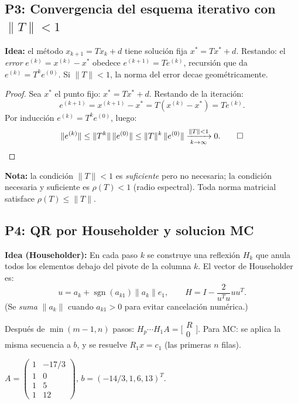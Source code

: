 \documentclass[11pt,a4paper]{article}
\begin{document}
\subsection{P3: Convergencia del esquema iterativo con $\|T\|<1$}
\label{sec:q2_2017_p3}

\textbf{Idea:} el método $x_{k+1}=Tx_k+d$ tiene solución fija $x^*=Tx^*+d$. Restando: el \emph{error} $e^{(k)}=x^{(k)}-x^*$ obedece $e^{(k+1)}=Te^{(k)}$, recursión que da $e^{(k)}=T^ke^{(0)}$. Si $\|T\|<1$, la norma del error decae geométricamente.

\begin{proof}
Sea $x^*$ el punto fijo: $x^* = Tx^* + d$. Restando de la iteración:
\[
  e^{(k+1)} = x^{(k+1)} - x^* = T(x^{(k)}-x^*) = Te^{(k)}.
\]
Por inducción $e^{(k)} = T^k e^{(0)}$, luego:
\[
  \|e^{(k)}\| \le \|T^k\|\,\|e^{(0)}\| \le \|T\|^k\,\|e^{(0)}\| \xrightarrow[k\to\infty]{\|T\|<1} 0. \qed
\]
\end{proof}

\textbf{Nota:} la condición $\|T\|<1$ es \emph{suficiente} pero no necesaria; la condición necesaria y suficiente es $\rho(T)<1$ (radio espectral). Toda norma matricial satisface $\rho(T)\le\|T\|$.

\subsection{P4: QR por Householder y solucion MC}
\label{sec:q2_2017_p4}

\textbf{Idea (Householder):} En cada paso $k$ se construye una reflexión $H_k$ que anula todos los elementos debajo del pivote de la columna $k$. El vector de Householder es:
\[
  u = a_k + \operatorname{sgn}(a_{k1})\|a_k\|e_1, \qquad H = I - \frac{2}{u^Tu}uu^T.
\]
(Se \emph{suma} $\|a_k\|$ cuando $a_{k1}>0$ para evitar cancelación numérica.)

Después de $\min(m-1,n)$ pasos: $H_p\cdots H_1 A = \bigl[\begin{smallmatrix}R\\0\end{smallmatrix}\bigr]$. Para MC: se aplica la misma secuencia a $b$, y se resuelve $R_1 x = c_1$ (las primeras $n$ filas).

$A = \begin{pmatrix}1&-17/3\\1&0\\1&5\\1&12\end{pmatrix}$,
$b = (-14/3,1,6,13)^T$.
\end{document}
